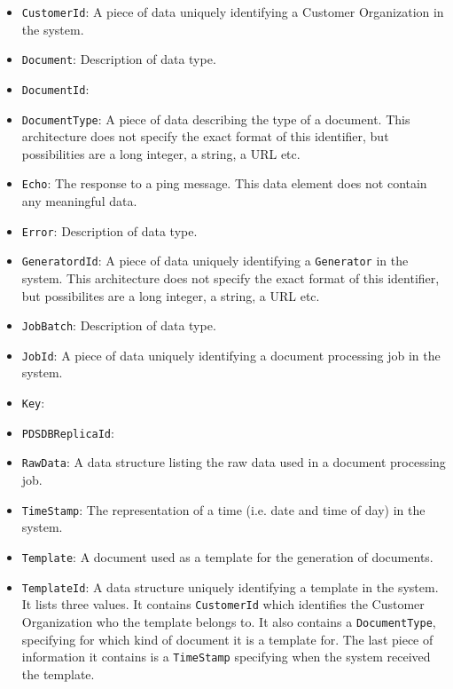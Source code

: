 \documentclass[a4paper,10pt]{article}
\begin{document}
\begin{itemize}
	\item \texttt{CustomerId}: A piece of data uniquely identifying a Customer Organization in the system.
	\item \texttt{Document}: Description of data type.
	\item \texttt{DocumentId}:
	\item \texttt{DocumentType}: A piece of data describing the type of a document. This architecture does not specify the exact format of this identifier, but possibilities are a long integer, a string, a URL etc.
	\item \texttt{Echo}: The response to a ping message. This data element does not contain any meaningful data.
	\item \texttt{Error}: Description of data type.
    \item \texttt{GeneratordId}: A piece of data uniquely identifying a \texttt{Generator} in the system. This architecture does not specify the exact format of this identifier, but possibilites are a long integer, a string, a URL etc.
    \item \texttt{JobBatch}: Description of data type.
    \item \texttt{JobId}: A piece of data uniquely identifying a document processing job in the system.
    \item \texttt{Key}:
    \item \texttt{PDSDBReplicaId}:
    \item \texttt{RawData}: A data structure listing the raw data used in a document processing job.
    \item \texttt{TimeStamp}: The representation of a time (i.e. date and time of day) in the system.
    \item \texttt{Template}: A document used as a template for the generation of documents.
    \item \texttt{TemplateId}: A data structure uniquely identifying a template in the system. It lists three values. It contains \texttt{CustomerId} which identifies the Customer Organization who the template belongs to. It also contains a \texttt{DocumentType}, specifying for which kind of document it is a template for. The last piece of information it contains is a \texttt{TimeStamp} specifying when the system received the template.
\end{itemize}
\end{document}
